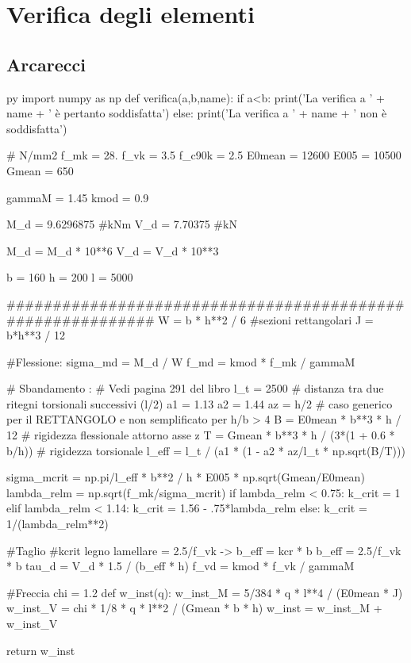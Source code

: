 \chapter{Verifica degli elementi}
\section{Arcarecci}

\begin{pythontexcustomcode}{py}
import numpy as np
def verifica(a,b,name):
    if a<b:
        print('La verifica a ' + name + ' è pertanto soddisfatta')
    else:
        print('La verifica a ' + name + ' non è soddisfatta')
\end{pythontexcustomcode}

\begin{pycode}
# N/mm2
f_mk = 28.
f_vk = 3.5
f_c90k = 2.5
E0mean = 12600
E005 = 10500
Gmean = 650

gammaM = 1.45
kmod = 0.9

M_d = 9.6296875 #kNm
V_d = 7.70375 #kN

M_d = M_d * 10**6 
V_d = V_d * 10**3 

b = 160
h = 200
l = 5000

###########################################################
W = b * h**2 / 6 #sezioni rettangolari
J = b*h**3 / 12

#Flessione:
sigma_md = M_d / W
f_md = kmod * f_mk / gammaM

# Sbandamento :
# Vedi pagina 291 del libro
l_t = 2500 # distanza tra due ritegni torsionali successivi (l/2)
a1 = 1.13
a2 = 1.44
az = h/2
# caso generico per il RETTANGOLO e non semplificato per h/b > 4
B = E0mean * b**3 * h / 12 # rigidezza flessionale attorno asse z
T = Gmean * b**3 * h / (3*(1 + 0.6 * b/h)) # rigidezza torsionale 
l_eff = l_t / (a1 * (1 - a2 * az/l_t * np.sqrt(B/T)))

sigma_mcrit = np.pi/l_eff * b**2 / h * E005 * np.sqrt(Gmean/E0mean)
lambda_relm = np.sqrt(f_mk/sigma_mcrit)
if lambda_relm < 0.75:
    k_crit = 1
elif lambda_relm < 1.14:
    k_crit = 1.56 - .75*lambda_relm
else:
    k_crit = 1/(lambda_relm**2)


#Taglio    
#kcrit legno lamellare = 2.5/f_vk -> b_eff = kcr * b
b_eff = 2.5/f_vk * b
tau_d = V_d * 1.5 / (b_eff * h)
f_vd = kmod * f_vk / gammaM

#Freccia
chi = 1.2
def w_inst(q): 
    w_inst_M = 5/384 * q * l**4 / (E0mean * J)
    w_inst_V = chi * 1/8 * q * l**2 / (Gmean * b * h)
    w_inst = w_inst_M + w_inst_V
    
    return w_inst

\end{pycode}

